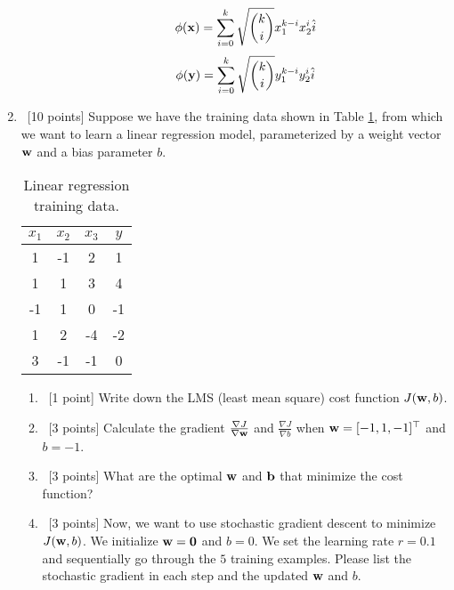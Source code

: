 \documentclass[12pt, fullpage,letterpaper]{article}
\begin{document}
\begin{enumerate}
\begin{enumerate}
        \[
            \phi({\bf x}) = \sum_{i=0}^k \sqrt{k \choose i} x_1^{k-i} x_2^{i} \hat{i}
        \]
        \[
            \phi({\bf y}) = \sum_{i=0}^k \sqrt{k \choose i} y_1^{k-i} y_2^{i} \hat{i}
        \]
		
	\end{enumerate}

\item~[10 points] Suppose we have the training data shown in Table \ref{tb:1}, from which we want to learn a linear regression model, parameterized by a weight vector ${\bf w}$ and a bias parameter $b$.  
\begin{table}
	\centering
	\begin{tabular}{ccc|c}
		$x_1 $ & $x_2$ & $x_3$ &  $y$\\ 
		\hline\hline
		1 & -1 & 2 & 1 \\ \hline
		1 & 1 & 3 & 4 \\ \hline
		-1 & 1 & 0 & -1 \\ \hline
		1 & 2 & -4 & -2 \\ \hline
		3 & -1 & -1 & 0\\ \hline
	\end{tabular}
	\caption{Linear regression training data.}\label{tb:1}
\end{table}

\begin{enumerate}
	\item~[1 point] Write down the LMS (least mean square) cost function $J({\bf w}, b)$. 
	\item~[3 points] Calculate the gradient $\frac{\nabla J}{\nabla {\bf w}}$ and $\frac{\nabla J}{\nabla b}$ when ${\bf w} = [-1,1,-1]^\top$ and $b = -1$.
	\item~[3 points] What are the optimal ${\bf w}$ and ${\bf b}$ that minimize the cost function? 
	\item~[3 points] Now, we want to use stochastic gradient descent to minimize $J({\bf w}, b)$. We initialize ${\bf w} = {\bf 0}$ and $b = 0$. We set the learning rate $r = 0.1$ and sequentially go through the $5$ training examples. Please list the stochastic gradient in each step and the updated ${\bf w}$ and $b$.  
\end{enumerate}
\end{enumerate}
\end{document}

